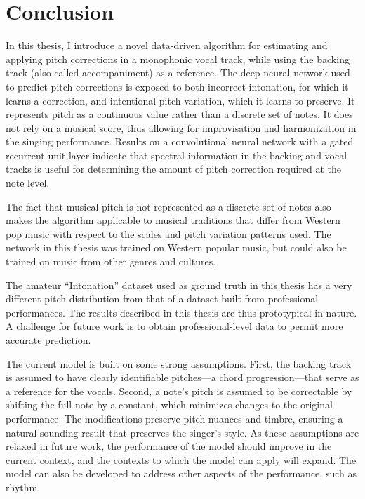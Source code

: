 \chapter{Conclusion}
\label{chap:conclusion}

In this thesis, I introduce a novel data-driven algorithm for estimating and applying pitch corrections in a monophonic vocal track, while using the backing track (also called accompaniment) as a reference. The deep neural network used to predict pitch corrections is exposed to both incorrect intonation, for which it learns a correction, and intentional pitch variation, which it learns to preserve. It represents pitch as a continuous value rather than a discrete set of notes. It does not rely on a musical score, thus allowing for improvisation and harmonization in the singing performance. Results on a convolutional neural network with a gated recurrent unit layer indicate that spectral information in the backing and vocal tracks is useful for determining the amount of pitch correction required at the note level. 

The fact that musical pitch is not represented as a discrete set of notes also makes the algorithm applicable to musical traditions that differ from Western pop music with respect to the scales and pitch variation patterns used. The network in this thesis was trained on Western popular music, but could also be trained on music from other genres and cultures.

The amateur ``Intonation'' dataset used as ground truth in this thesis has a very different pitch distribution from that of a dataset built from professional performances. The results described in this thesis are thus prototypical in nature. A challenge for future work is to obtain professional-level data to permit more accurate prediction. 

The current model is built on some strong assumptions. First, the backing track is assumed to have clearly identifiable pitches---a chord progression---that serve as a reference for the vocals. Second, a note's pitch is assumed to be correctable by shifting the full note by a constant, which minimizes changes to the original performance. The modifications preserve pitch nuances and timbre, ensuring a natural sounding result that preserves the singer's style. As these assumptions are relaxed in future work, the performance of the model should improve in the current context, and the contexts to which the model can apply will expand. The model can also be developed to address other aspects of the performance, such as rhythm. 

